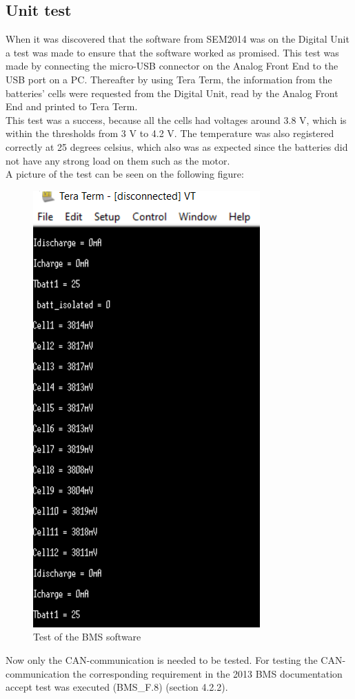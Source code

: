 \subsection{Unit test}
When it was discovered that the software from SEM2014 was on the Digital Unit a test was made to ensure that the software worked as promised. This test was made by connecting the micro-USB connector on the Analog Front End to the USB port on a PC. Thereafter by using Tera Term, the information from the batteries' cells were requested from the Digital Unit, read by the Analog Front End and printed to Tera Term.\\ 
This test was a success, because all the cells had voltages around 3.8 V, which is within the thresholds from 3 V to 4.2 V. The temperature was also registered correctly at 25 degrees celsius, which also was as expected since the batteries did not have any strong load on them such as the motor.\\
A picture of the test can be seen on the following figure:\\
\begin{figure}[H]
	\centering
	\includegraphics[width=0.5\linewidth]{Software/BMS_teraterm_test.PNG}
	\caption{Test of the BMS software}
	\label{fig:SoftwareTest_teraterm_BMS}
\end{figure}

Now only the CAN-communication is needed to be tested. For testing the CAN-communication the corresponding requirement in the 2013 BMS documentation accept test was executed (BMS\_F.8) \cite{BMSDocumentation} (section 4.2.2).\\

